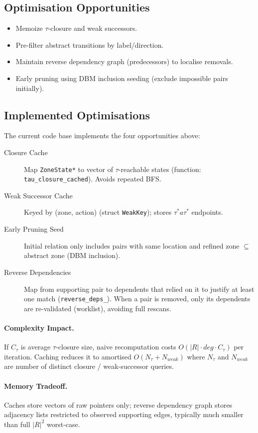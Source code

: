 \subsection{Optimisation Opportunities}
\begin{itemize}
  \item Memoize $\tau$-closure and weak successors.
  \item Pre-filter abstract transitions by label/direction.
  \item Maintain reverse dependency graph (predecessors) to localise removals.
  \item Early pruning using DBM inclusion seeding (exclude impossible pairs initially).
\end{itemize}

\subsection{Implemented Optimisations}
The current code base implements the four opportunities above:
\begin{description}
  \item[Closure Cache] Map \texttt{ZoneState*} to vector of $\tau$-reachable states (function: \texttt{tau\_closure\_cached}). Avoids repeated BFS.
  \item[Weak Successor Cache] Keyed by (zone, action) (struct \texttt{WeakKey}); stores $\tau^* a \tau^*$ endpoints.
  \item[Early Pruning Seed] Initial relation only includes pairs with same location and refined zone $\subseteq$ abstract zone (DBM inclusion).
  \item[Reverse Dependencies] Map from supporting pair to dependents that relied on it to justify at least one match (\texttt{reverse\_deps\_}). When a pair is removed, only its dependents are re-validated (worklist), avoiding full rescans.
\end{description}

\paragraph{Complexity Impact.} If $C_\tau$ is average $\tau$-closure size, naive recomputation costs $O(|R|\cdot deg \cdot C_\tau)$ per iteration. Caching reduces it to amortised $O(N_\tau + N_{weak})$ where $N_\tau$ and $N_{weak}$ are number of distinct closure / weak-successor queries.

\paragraph{Memory Tradeoff.} Caches store vectors of raw pointers only; reverse dependency graph stores adjacency lists restricted to observed supporting edges, typically much smaller than full $|R|^2$ worst-case.

